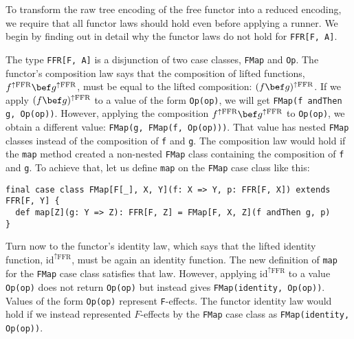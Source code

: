To transform the raw tree encoding of the free functor into a reduced
encoding, we require that all functor laws should hold even before
applying a runner. We begin by finding out in detail why the functor
laws do not hold for \lstinline!FFR[F, A]!.

The type \lstinline!FFR[F, A]!
is a disjunction of two case classes, \lstinline!FMap!
and \lstinline!Op!. The
functor\textsf{'}s composition law says that the composition of lifted functions,
$f^{\uparrow\text{FFR}}\bef g^{\uparrow\text{FFR}}$, must be equal
to the lifted composition: $(f\bef g)^{\uparrow\text{FFR}}$. If we
apply $(f\bef g)^{\uparrow\text{FFR}}$ to a value of the form \lstinline!Op(op)!,
we will get \lstinline!FMap(f andThen g, Op(op))!.
However, applying the composition $f^{\uparrow\text{FFR}}\bef g^{\uparrow\text{FFR}}$
to \lstinline!Op(op)!,
we obtain a different value: \lstinline!FMap(g, FMap(f, Op(op)))!.
That value has nested \lstinline!FMap!
classes instead of the composition of \lstinline!f!
and \lstinline!g!. The
composition law would hold if the \lstinline!map!
method created a non-nested \lstinline!FMap!
class containing the composition of \lstinline!f!
and \lstinline!g!. To achieve
that, let us define \lstinline!map!
on the \lstinline!FMap!
case class like this:
\begin{lstlisting}
final case class FMap[F[_], X, Y](f: X => Y, p: FFR[F, X]) extends FFR[F, Y] {
  def map[Z](g: Y => Z): FFR[F, Z] = FMap[F, X, Z](f andThen g, p)
}
\end{lstlisting}
Turn now to the functor\textsf{'}s identity law, which says that the lifted
identity function, $\text{id}^{\uparrow\text{FFR}}$, must be again
an identity function. The new definition of \lstinline!map!
for the \lstinline!FMap!
case class satisfies that law. However, applying $\text{id}^{\uparrow\text{FFR}}$
to a value \lstinline!Op(op)!
does not return \lstinline!Op(op)!
but instead gives \lstinline!FMap(identity, Op(op))!.
Values of the form \lstinline!Op(op)!
represent \lstinline!F!-effects.
The functor identity law would hold if we instead represented $F$-effects
by the \lstinline!FMap!
case class as \lstinline!FMap(identity, Op(op))!.

